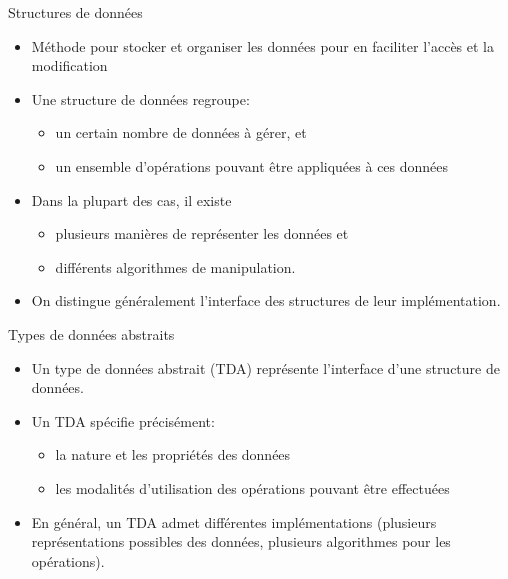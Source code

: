 \begin{frame}{Structures de données}

\begin{itemize}
\item Méthode pour stocker et organiser les données pour en faciliter
  l'accès et la modification
\item Une structure de données regroupe:
\begin{itemize}
\item un certain nombre de données à gérer, et
\item un ensemble d'opérations pouvant être appliquées à ces données
\end{itemize}
\item Dans la plupart des cas, il existe
\begin{itemize}
\item plusieurs manières de représenter les données et
\item différents algorithmes de manipulation.
\end{itemize}
\item On distingue généralement l'\alert{interface} des structures de
  leur \alert{implémentation}.
\end{itemize}

\end{frame}

\begin{frame}{Types de données abstraits}

\begin{itemize}
\item Un type de données abstrait (TDA) représente l'interface d'une structure de données.
\item Un TDA spécifie précisément:
\begin{itemize}
\item la nature et les propriétés des données
\item les modalités d'utilisation des opérations pouvant être effectuées
\end{itemize}
\item En général, un TDA admet différentes implémentations (plusieurs représentations possibles des données, plusieurs algorithmes pour les opérations).
\end{itemize}
\end{frame}

